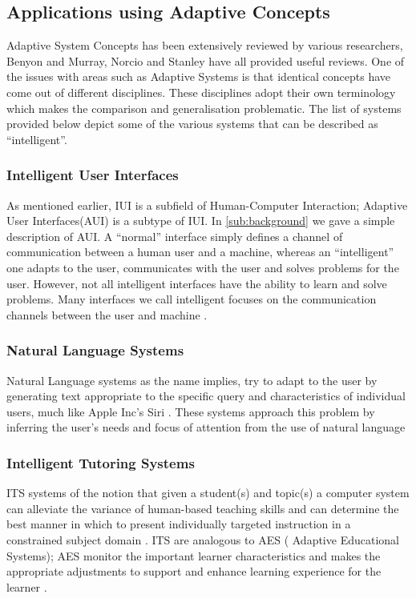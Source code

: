 \subsection{Applications using Adaptive Concepts}
Adaptive System Concepts has been extensively reviewed by various researchers, Benyon and Murray\cite{benyon1993applying}, Norcio and Stanley\cite{norcio1989adaptive} have all provided useful reviews. One of the issues with areas such as Adaptive Systems is that identical concepts have come out of different disciplines. These disciplines adopt their own terminology which makes the comparison and generalisation problematic. The list of systems provided below depict some of the various systems that can be described as ``intelligent''.
\subsubsection{Intelligent User Interfaces}
As mentioned earlier, IUI is a subfield of Human-Computer Interaction; Adaptive User Interfaces(AUI) is a subtype of IUI. In \ref{sub:background} we gave a simple description of AUI. A ``normal'' interface simply defines a channel of communication between a human user and a machine, whereas an ``intelligent'' one adapts to the user, communicates with the user and solves problems for the user.
However, not all intelligent interfaces have the ability to learn and solve problems. Many interfaces we call intelligent focuses on the communication channels between the user and machine \cite{patrick2003intelligent}.
\subsubsection{Natural Language Systems}
Natural Language systems as the name implies, try to adapt to the user by generating text appropriate to the specific query and characteristics of individual users, much like Apple Inc's Siri \cite{website:SIRI}. These systems approach this problem by inferring the user's needs and focus of attention from the use of natural language \cite{benyon1993adaptive}
\subsubsection{Intelligent Tutoring Systems}
ITS systems of the notion that given a student(s) and topic(s) a computer system can alleviate the variance of human-based teaching skills and can determine the best manner in which to present individually targeted instruction in a constrained subject domain \cite{benyon1993adaptive}. ITS are analogous to AES ( Adaptive Educational Systems); AES monitor the important learner characteristics and makes the appropriate adjustments to support and enhance learning experience for the learner \cite{shute2012adaptive}.
